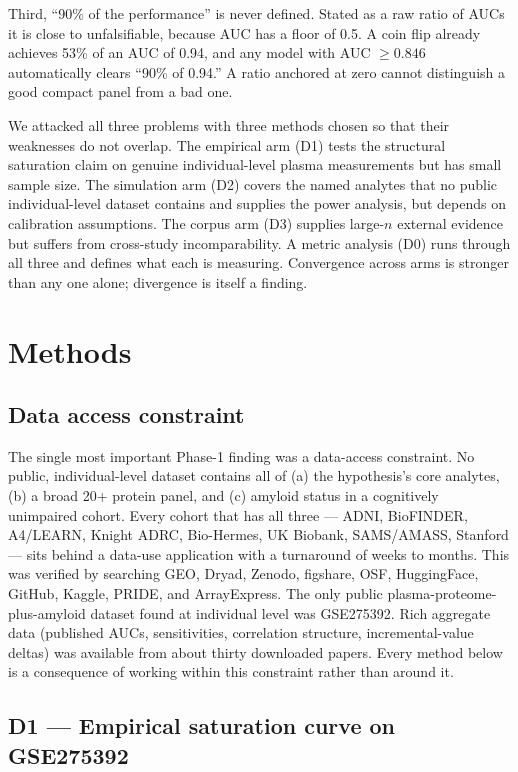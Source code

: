 \documentclass{article}
\begin{document}
Third, ``90\% of the performance'' is never defined. Stated as a raw ratio of
AUCs it is close to unfalsifiable, because AUC has a floor of 0.5. A coin flip
already achieves 53\% of an AUC of 0.94, and any model with AUC $\geq 0.846$
automatically clears ``90\% of 0.94.'' A ratio anchored at zero cannot
distinguish a good compact panel from a bad one.

We attacked all three problems with three methods chosen so that their
weaknesses do not overlap. The empirical arm (D1) tests the structural
saturation claim on genuine individual-level plasma measurements but has small
sample size. The simulation arm (D2) covers the named analytes that no public
individual-level dataset contains and supplies the power analysis, but depends
on calibration assumptions. The corpus arm (D3) supplies large-$n$ external
evidence but suffers from cross-study incomparability. A metric analysis (D0)
runs through all three and defines what each is measuring. Convergence across
arms is stronger than any one alone; divergence is itself a finding.

\section{Methods}

\subsection{Data access constraint}

The single most important Phase-1 finding was a data-access constraint. No
public, individual-level dataset contains all of (a) the hypothesis's core
analytes, (b) a broad 20+ protein panel, and (c) amyloid status in a
cognitively unimpaired cohort. Every cohort that has all three --- ADNI,
BioFINDER, A4/LEARN, Knight ADRC, Bio-Hermes, UK Biobank, SAMS/AMASS, Stanford
--- sits behind a data-use application with a turnaround of weeks to months.
This was verified by searching GEO, Dryad, Zenodo, figshare, OSF, HuggingFace,
GitHub, Kaggle, PRIDE, and ArrayExpress. The only public
plasma-proteome-plus-amyloid dataset found at individual level was GSE275392.
Rich aggregate data (published AUCs, sensitivities, correlation structure,
incremental-value deltas) was available from about thirty downloaded papers.
Every method below is a consequence of working within this constraint rather
than around it.

\subsection{D1 --- Empirical saturation curve on GSE275392}
\end{document}
